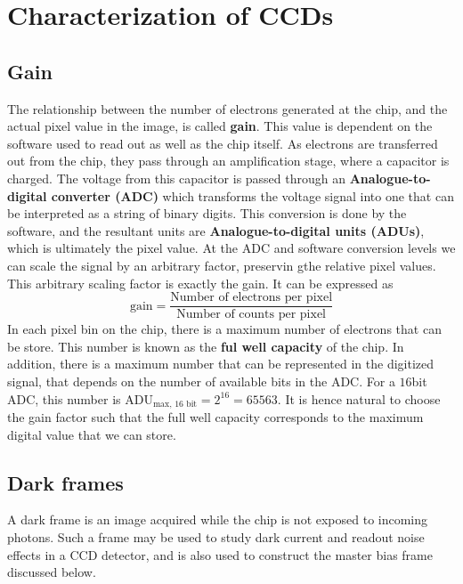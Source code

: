 \documentclass[../main.tex]{subfiles}
\begin{document}
	
	
	
	\section{Characterization of CCDs}
	
	\subsection{Gain}
	The relationship between the number of electrons generated at the chip, and the actual pixel value in the image, is called \textbf{gain}\cite{handbookofccdastronomy}. This value is dependent on the software used to read out as well as the chip itself. As electrons are transferred out from the chip, they pass through an amplification stage, where a capacitor is charged. The voltage from this capacitor is passed through an \textbf{Analogue-to-digital converter (ADC)} which transforms the voltage signal into one that can be interpreted as a string of binary digits. This conversion is done by the software, and the resultant units are \textbf{Analogue-to-digital units (ADUs)}, which is ultimately the pixel value. At the ADC and software conversion levels we can scale the signal by an arbitrary factor, preservin gthe relative pixel values. This arbitrary scaling factor is exactly the gain. It can be expressed as
	\begin{equation}
		\text{gain} = \frac{\text{Number of electrons per pixel}}{\text{Number of counts per pixel}}
	\end{equation} 
	In each pixel bin on the chip, there is a maximum number of electrons that can be store. This number is known as the \textbf{ful well capacity} of the chip. In addition, there is a maximum number that can be represented in the digitized signal, that depends on the number of available bits in the ADC. For a $16$bit ADC, this number is $\text{ADU}_{\text{max, 16 bit}} = 2^{16} = 65563$. It is hence natural to choose the gain factor such that the full well capacity corresponds to the maximum digital value that we can store.
	
	\subsection{Dark frames}
	A dark frame is an image acquired while the chip is not exposed to incoming photons. Such a frame may be used to study dark current and readout noise effects in a CCD detector, and is also used to construct the master bias frame discussed below.
	
\end{document}
